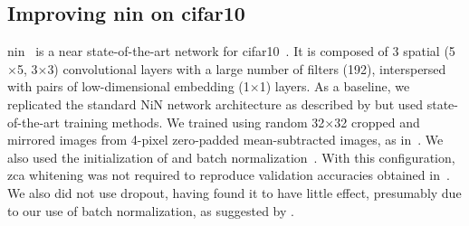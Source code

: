 \documentclass[thesis]{subfiles}
\begin{document}
	\subsection{Improving \Gls{nin} on \Gls{cifar10}}
	\Gls{nin}~\citep{Lin2013NiN} is a near state-of-the-art network for \gls{cifar10}~\citep{CIFAR10}. It is composed of 3 spatial (5$\times$5, 3$\times$3) convolutional layers with a large number of filters (192), interspersed with pairs of low-dimensional embedding (1$\times$1) layers. As a baseline, we replicated the standard NiN network architecture as described by \citet{Lin2013NiN} but used state-of-the-art training methods. We trained using random 32$\times$32 cropped and mirrored images from 4-pixel zero-padded  mean-subtracted images, as in~\citep{goodfellow2013maxout, He2015}. We also used the initialization of \citet{He2015b} and batch normalization~\citep{Ioffe2015}. With this configuration, \gls{zca} whitening was not required to reproduce validation accuracies obtained in~\citep{Lin2013NiN}. We also did not use dropout, having found it to have little effect, presumably due to our use of batch normalization, as suggested by \citet{Ioffe2015}.
	
\end{document}
